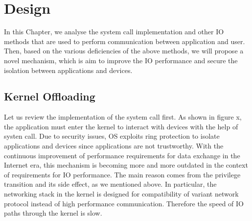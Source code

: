 \chapter{Design}
\label{sec:design}





In this Chapter, we analyse the system call implementation and other IO methods that are used to perform communication between application and user. Then, based on the various deficiencies of the above methods, we will propose a novel mechanism, which is aim to improve the IO performance and secure the isolation between applications and devices.

\section{Kernel Offloading}
Let us review the implementation of the system call first. As shown in figure x, the application must enter the kernel to interact with devices with the help of systen call.  Due to security issues, OS exploits ring protection to isolate applications and devices since applications are not trustworthy. With the continuous improvement of performance requirements for data exchange in the Internet era, this mechanism is becoming more and more outdated in the context of requirements for IO performance. The main reason comes from the privilege transition and its side effect, as we mentioned above. In particular, the networking stack in the kernel is designed for compatibility of variant network protocol instead of high performance communication. Therefore the speed of IO paths through the kernel is slow.

